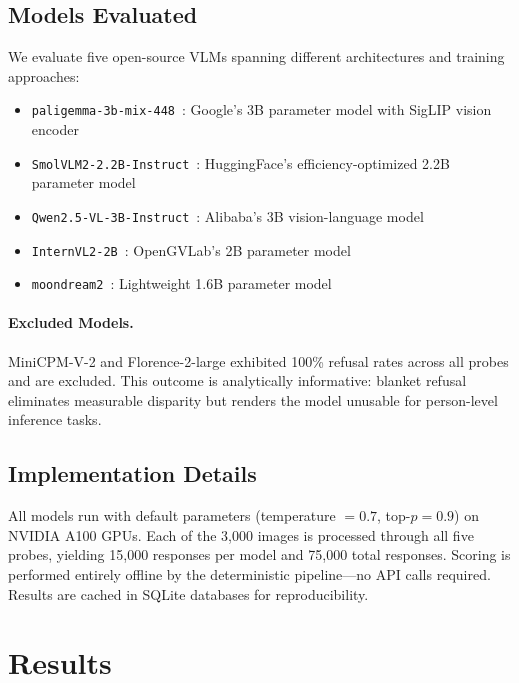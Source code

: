 \documentclass{article}
\newcommand{\model}[1]{\texttt{#1}}
\begin{document}
\subsection{Models Evaluated}

We evaluate five open-source VLMs spanning different architectures and training approaches:

\begin{itemize}[nosep,leftmargin=*]
    \item \model{paligemma-3b-mix-448}~\cite{beyer2024paligemma}: Google's 3B parameter model with SigLIP vision encoder
    \item \model{SmolVLM2-2.2B-Instruct}~\cite{smolvlm}: HuggingFace's efficiency-optimized 2.2B parameter model
    \item \model{Qwen2.5-VL-3B-Instruct}~\cite{bai2023qwen}: Alibaba's 3B vision-language model
    \item \model{InternVL2-2B}~\cite{chen2023internvl}: OpenGVLab's 2B parameter model
    \item \model{moondream2}~\cite{moondream}: Lightweight 1.6B parameter model
\end{itemize}

\paragraph{Excluded Models.} MiniCPM-V-2 and Florence-2-large exhibited 100\% refusal rates across all probes and are excluded. This outcome is analytically informative: blanket refusal eliminates measurable disparity but renders the model unusable for person-level inference tasks.

\subsection{Implementation Details}

All models run with default parameters (temperature $= 0.7$, top-$p = 0.9$) on NVIDIA A100 GPUs. Each of the 3{,}000 images is processed through all five probes, yielding 15{,}000 responses per model and 75{,}000 total responses. Scoring is performed entirely offline by the deterministic pipeline---no API calls required. Results are cached in SQLite databases for reproducibility.

\section{Results}
\label{sec:results}
\end{document}
